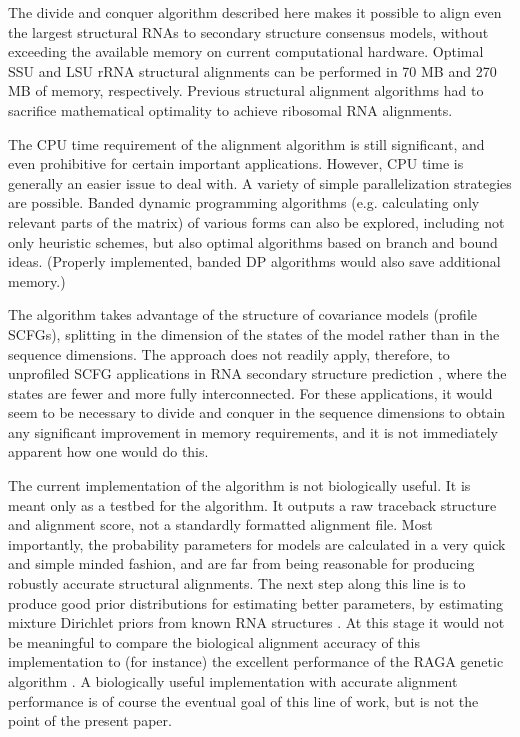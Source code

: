 \documentclass[11pt]{article}
\begin{document}
The divide and conquer algorithm described here makes it possible to
align even the largest structural RNAs to secondary structure
consensus models, without exceeding the available memory on current
computational hardware. Optimal SSU and LSU rRNA structural alignments
can be performed in 70 MB and 270 MB of memory, respectively. Previous
structural alignment algorithms had to sacrifice mathematical
optimality to achieve ribosomal RNA alignments.

The CPU time requirement of the alignment algorithm is still
significant, and even prohibitive for certain important
applications. However, CPU time is generally an easier issue to deal
with. A variety of simple parallelization strategies are
possible. Banded dynamic programming algorithms (e.g. calculating only
relevant parts of the matrix) of various forms can also be explored,
including not only heuristic schemes, but also optimal algorithms
based on branch and bound ideas. (Properly implemented, banded DP
algorithms would also save additional memory.)

The algorithm takes advantage of the structure of covariance models
(profile SCFGs), splitting in the dimension of the states of the model
rather than in the sequence dimensions. The approach does not readily
apply, therefore, to unprofiled SCFG applications in RNA secondary
structure prediction
\cite{RivasEddy99,RivasEddy00a,KnudsenHein99,HolmesRubin02}, where the
states are fewer and more fully interconnected. For these
applications, it would seem to be necessary to divide and conquer in
the sequence dimensions to obtain any significant improvement in
memory requirements, and it is not immediately apparent how one would
do this.

The current implementation of the algorithm is not biologically
useful. It is meant only as a testbed for the algorithm. It outputs a
raw traceback structure and alignment score, not a standardly
formatted alignment file. Most importantly, the probability parameters
for models are calculated in a very quick and simple minded fashion,
and are far from being reasonable for producing robustly accurate
structural alignments. The next step along this line is to produce
good prior distributions for estimating better parameters, by
estimating mixture Dirichlet priors from known RNA structures
\cite{Sjolander96}.  At this stage it would not be meaningful to
compare the biological alignment accuracy of this implementation to
(for instance) the excellent performance of the RAGA genetic algorithm
\cite{Notredame97}.  A biologically useful implementation with
accurate alignment performance is of course the eventual goal of this
line of work, but is not the point of the present paper.
\end{document}
